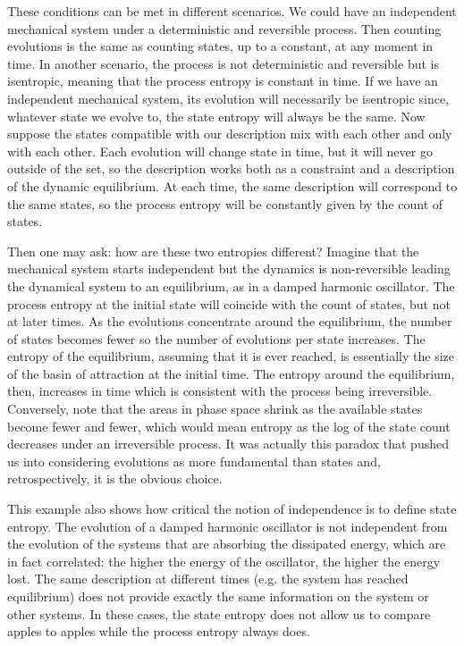 \documentclass[letterpaper,twocolumn]{article}
\begin{document}
These conditions can be met in different scenarios. We could have an independent mechanical system under a deterministic and reversible process. Then counting evolutions is the same as counting states, up to a constant, at any moment in time. In another scenario, the process is not deterministic and reversible but is isentropic, meaning that the process entropy is constant in time. If we have an independent mechanical system, its evolution will necessarily be isentropic since, whatever state we evolve to, the state entropy will always be the same. Now suppose the states compatible with our description mix with each other and only with each other. Each evolution will change state in time, but it will never go outside of the set, so the description works both as a constraint and a description of the dynamic equilibrium. At each time, the same description will correspond to the same states, so the process entropy will be constantly given by the count of states.

Then one may ask: how are these two entropies different? Imagine that the mechanical system starts independent but the dynamics is non-reversible leading the dynamical system to an equilibrium, as in a damped harmonic oscillator. The process entropy at the initial state will coincide with the count of states, but not at later times. As the evolutions concentrate around the equilibrium, the number of states becomes fewer so the number of evolutions per state increases. The entropy of the equilibrium, assuming that it is ever reached, is essentially the size of the basin of attraction at the initial time. The entropy around the equilibrium, then, increases in time which is consistent with the process being irreversible. Conversely, note that the areas in phase space shrink as the available states become fewer and fewer, which would mean entropy as the log of the state count decreases under an irreversible process. It was actually this paradox that pushed us into considering evolutions as more fundamental than states and, retrospectively, it is the obvious choice.

This example also shows how critical the notion of independence is to define state entropy. The evolution of a damped harmonic oscillator is not independent from the evolution of the systems that are absorbing the dissipated energy, which are in fact correlated: the higher the energy of the oscillator, the higher the energy lost. The same description at different times (e.g. the system has reached equilibrium) does not provide exactly the same information on the system or other systems. In these cases, the state entropy does not allow us to compare apples to apples while the process entropy always does.
\end{document}
